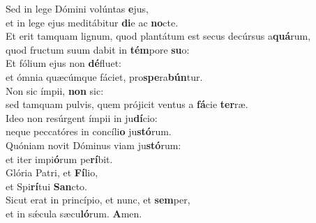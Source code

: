 \evenverse Sed in lege Dómini volúntas \textbf{e}jus,~\*\\
\evenverse et in lege ejus meditábitur \textbf{di}e ac \textbf{no}cte.\\
\oddverse Et erit tamquam lignum, quod plantátum est secus decúrsus a\textbf{quá}rum,~\*\\
\oddverse quod fructum suum dabit in \textbf{tém}pore \textbf{su}o:\\
\evenverse Et fólium ejus non \textbf{dé}fluet:~\*\\
\evenverse et ómnia quæcúmque fáciet, pro\textbf{spe}ra\textbf{bún}tur.\\
\oddverse Non sic ímpii, \textbf{non} sic:~\*\\
\oddverse sed tamquam pulvis, quem prójicit ventus a \textbf{fá}cie \textbf{ter}ræ.\\
\evenverse Ideo non resúrgent ímpii in ju\textbf{dí}cio:~\*\\
\evenverse neque peccatóres in concíli\textbf{o} ju\textbf{stó}rum.\\
\oddverse Quóniam novit Dóminus viam ju\textbf{stó}rum:~\*\\
\oddverse et iter impi\textbf{ó}rum pe\textbf{rí}bit.\\
\evenverse Glória Patri, et \textbf{Fí}lio,~\*\\
\evenverse et Spi\textbf{rí}tui \textbf{San}cto.\\
\oddverse Sicut erat in princípio, et nunc, et \textbf{sem}per,~\*\\
\oddverse et in sǽcula sæcu\textbf{ló}rum. \textbf{A}men.\\
